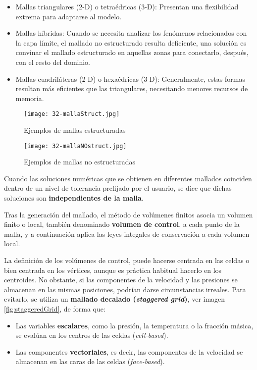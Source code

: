 \begin{itemize}
  \begin{itemize}
  \item
    Mallas triangulares (2-D) o tetraédricas (3-D): Presentan una
    flexibilidad extrema para adaptarse al modelo.
  \item
    Mallas híbridas: Cuando se necesita analizar los fenómenos
    relacionados con la capa límite, el mallado no estructurado resulta
    deficiente, una solución es convinar el mallado estructurado en
    aquellas zonas para conectarlo, después, con el resto del dominio.
  \item
    Mallas cuadriláteras (2-D) o hexaédricas (3-D): Generalmente, estas
    formas resultan más eficientes que las triangulares, necesitando
    menores recursos de memoria.
  \end{itemize}
\end{itemize}

\begin{figure}
\centering
\texttt{[image: 32-mallaStruct.jpg]}
\caption{Ejemplos de mallas estructuradas}
\label{fig:mallaStruct}
\end{figure}

\begin{figure}[ht]
\centering
\texttt{[image: 32-mallaNOstruct.jpg]}
\caption{Ejemplos de mallas no estructuradas}
\label{fig:mallaNOstruct}
\end{figure}

Cuando las soluciones numéricas que se obtienen en diferentes mallados
coinciden dentro de un nivel de tolerancia prefijado por el usuario, se
dice que dichas soluciones son \textbf{independientes de la malla}.

Tras la generación del mallado, el método de volúmenes finitos asocia un
volumen finito o local, también denominado \textbf{volumen de control},
a cada punto de la malla, y a continuación aplica las leyes integales de
conservación a cada volumen local.

La definición de los volúmenes de control, puede hacerse centrada en las
celdas o bien centrada en los vértices, aunque es práctica habitual
hacerlo en los centroides. No obstante, si las componentes de la
velocidad y las presiones se almacenan en las mismas posiciones, podrían
darse circunstancias irreales. Para evitarlo, se utiliza un
\textbf{mallado decalado (\emph{staggered grid})}, ver imagen \autoref{fig:staggeredGrid}, de forma que:

\begin{itemize}
\item
  Las variables \textbf{escalares}, como la presión, la temperatura o la
  fracción másica, se evalúan en los centros de las celdas
  (\emph{cell-based}).
\item
  Las componentes \textbf{vectoriales}, es decir, las componentes de la
  velocidad se almacenan en las caras de las celdas (\emph{face-based}).
\end{itemize}

